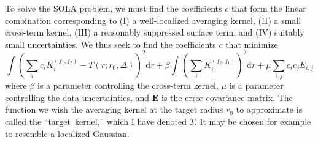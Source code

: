 To solve the SOLA problem, we must find the coefficients $c$ that form the linear combination corresponding to (I) a well-localized averaging kernel, (II) a small cross-term kernel, (III) a reasonably suppressed surface term, and (IV) suitably small uncertainties. 
We thus seek to find the coefficients $c$ that minimize
\begin{equation}
    \int\left(
        \sum_i c_i K_i^{(f_1,f_2)} - T(r; r_0, \Delta)
    \right)^2
    \text{d}r
    +
    \beta \int\left(
        \sum_i K_i^{(f_2,f_1)}
    \right)^2
    \text{d}r
    +
    \mu \sum_{i,j} c_i c_j E_{i,j}
\end{equation}
where $\beta$ is a parameter controlling the cross-term kernel, $\mu$ is a parameter controlling the data uncertainties, and $\mathbf{E}$ is the error covariance matrix.
The function we wish the averaging kernel at the target radius $r_0$ to approximate is called the ``target~kernel,'' which I have denoted $T$. 
It may be chosen for example to resemble a localized Gaussian. 

